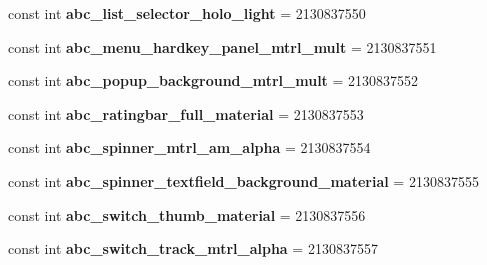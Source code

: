 \begin{DoxyCompactItemize}
\item 
\hypertarget{classClient_1_1Droid_1_1Resource_1_1Drawable_ac62a77e69a9df0fc6b257c881bbb1c42}{}const int {\bfseries abc\+\_\+list\+\_\+selector\+\_\+holo\+\_\+light} = 2130837550\label{classClient_1_1Droid_1_1Resource_1_1Drawable_ac62a77e69a9df0fc6b257c881bbb1c42}

\item 
\hypertarget{classClient_1_1Droid_1_1Resource_1_1Drawable_ada0bf60944ef45a6c7d54d7e77e796b2}{}const int {\bfseries abc\+\_\+menu\+\_\+hardkey\+\_\+panel\+\_\+mtrl\+\_\+mult} = 2130837551\label{classClient_1_1Droid_1_1Resource_1_1Drawable_ada0bf60944ef45a6c7d54d7e77e796b2}

\item 
\hypertarget{classClient_1_1Droid_1_1Resource_1_1Drawable_aaf0d66533d3449a2b11e840cd25ffb9f}{}const int {\bfseries abc\+\_\+popup\+\_\+background\+\_\+mtrl\+\_\+mult} = 2130837552\label{classClient_1_1Droid_1_1Resource_1_1Drawable_aaf0d66533d3449a2b11e840cd25ffb9f}

\item 
\hypertarget{classClient_1_1Droid_1_1Resource_1_1Drawable_ad658791b5b74607cf4b2aa2e8c883dfd}{}const int {\bfseries abc\+\_\+ratingbar\+\_\+full\+\_\+material} = 2130837553\label{classClient_1_1Droid_1_1Resource_1_1Drawable_ad658791b5b74607cf4b2aa2e8c883dfd}

\item 
\hypertarget{classClient_1_1Droid_1_1Resource_1_1Drawable_adcd869e62ddd0b2b738288e81452a544}{}const int {\bfseries abc\+\_\+spinner\+\_\+mtrl\+\_\+am\+\_\+alpha} = 2130837554\label{classClient_1_1Droid_1_1Resource_1_1Drawable_adcd869e62ddd0b2b738288e81452a544}

\item 
\hypertarget{classClient_1_1Droid_1_1Resource_1_1Drawable_a205020df88da78594f81d0a5869adf5f}{}const int {\bfseries abc\+\_\+spinner\+\_\+textfield\+\_\+background\+\_\+material} = 2130837555\label{classClient_1_1Droid_1_1Resource_1_1Drawable_a205020df88da78594f81d0a5869adf5f}

\item 
\hypertarget{classClient_1_1Droid_1_1Resource_1_1Drawable_a1441b593803de94ffc35ccf3d23a2c41}{}const int {\bfseries abc\+\_\+switch\+\_\+thumb\+\_\+material} = 2130837556\label{classClient_1_1Droid_1_1Resource_1_1Drawable_a1441b593803de94ffc35ccf3d23a2c41}

\item 
\hypertarget{classClient_1_1Droid_1_1Resource_1_1Drawable_acaeb9d01d31512ea76a61522cdb6b252}{}const int {\bfseries abc\+\_\+switch\+\_\+track\+\_\+mtrl\+\_\+alpha} = 2130837557\label{classClient_1_1Droid_1_1Resource_1_1Drawable_acaeb9d01d31512ea76a61522cdb6b252}


\end{DoxyCompactItemize}
